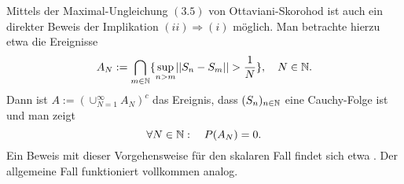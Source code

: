 \begin{remark}
    Mittels der Maximal-Ungleichung $(3.5)$ von Ottaviani-Skorohod ist auch ein direkter Beweis der Implikation $(ii) \Rightarrow (i)$ möglich. Man betrachte hierzu etwa die Ereignisse 
    $$
        A_N := \bigcap_{m \in \mathbb{N}}\{\sup_{n > m} \lvert\lvert S_n - S_m \rvert\rvert > \frac{1}{N}\}, \quad N \in \mathbb{N}.                                                                                                                        
    $$
    Dann ist $A := (\cup_{N=1}^{\infty} A_N)^c$ das Ereignis, dass $(S_n)_{n \in \mathbb{N}}$ eine Cauchy-Folge ist und man zeigt 
    $$
        \forall N \in \mathbb{N}: \quad P(A_N) = 0. 
    $$
    Ein Beweis mit dieser Vorgehensweise für den skalaren Fall findet sich etwa \cite[Theorem 14.2]{bauer}. Der allgemeine Fall funktioniert vollkommen analog. \qexampled
\end{remark}



